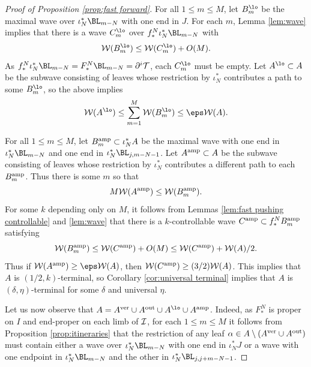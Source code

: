 \documentclass[12pt]{amsart}
\begin{document}
\begin{proof}[Proof of Proposition \ref{prop:fast forward}]
	
	
	
	For all $1\leq m \leq M$, let $B^\lo_m$ be the maximal wave over $\iota_N^*\BL_{m-N}$ with one end in $J$. For each $m$, Lemma \ref{lem:wave} implies that there is a wave $C^\lo_m$ over $f^N_*\iota_N^*\BL_{m-N}$ with 
	$$\WW(B^\lo_m)\leq \WW(C^\lo_m)+O(M).$$
	As $f^N_*\iota_N^*\BL_{m-N}= F_*^N\BL_{m-N} = \ddi\TT$, each $C^\lo_m$ must be empty. 
	Let $A^\lo\subset A$ be the subwave consisting of leaves whose restriction by $\iota_N^*$ contributes a path to some $B_m^\lo$, so the above implies 
	$$\WW(A^\lo)\leq \sum_{m=1}^M\WW(B_m^\lo)\leq \eps\WW(A).$$
	
	
	For all $1\leq m\leq M$, let $B_m^{\mathrm{amp}}\subset \iota_{N}^*A$
	be the maximal wave with one end in $\iota_N^*\BL_{m-N}$ and one end in $\iota_N^*\BL_{j, m-N-1}$. Let $A^{\mathrm{amp}}\subset A$ be the subwave consisting of leaves whose restriction by $\iota_{N}^*$ contributes a different path to each $B_m^{\mathrm{amp}}$. 
	Thus there is some $m$ so that 
	$$M\mathcal W(A^{\mathrm{amp}})\leq \mathcal W(B_m^{\mathrm{amp}}).$$
	For some $k$ depending only on $M$, it follows from Lemmas \ref{lem:fast pushing controllable} and \ref{lem:wave} that there is a $k$-controllable wave $C^{\mathrm{amp}}\subset f^{N}_*B_m^{\mathrm{amp}}$ satisfying 
	$$\mathcal W(B_m^{\mathrm{amp}})\leq \mathcal W(C^{\mathrm{amp}})+O(M)\leq \mathcal W(C^{\mathrm{amp}})+ \mathcal W(A)/2.$$
	Thus if $\WW(A^\amp)\geq \eps\WW(A)$, then $\mathcal W(C^{\mathrm{amp}})\geq (3/2)\mathcal W(A)$. This implies that $A$ is $(1/2, k)$-terminal, so Corollary \ref{cor:universal terminal} implies that $A$ is $(\delta, \eta)$-terminal for some $\delta$ and universal $\eta$.
	
	
	Let us now observe that $A= A^\ver\cup A^{\out}\cup A^\lo\cup A^\amp$. 
	Indeed, as $F_*^N$ is proper on $I$ and end-proper on each limb of $\mathcal I$,  for each $1\leq m \leq M$ it follows from Proposition \ref{prop:itineraries} that the restriction of any  leaf $\alpha\in A\setminus (A^{\mathrm{ver}}\cup A^{\operatorname{out}})$ must  contain either a wave over $\iota_N^*\BL_{m-N}$  with one end in $\iota_N^*J$ or a wave with one endpoint in $\iota_N^*\BL_{m-N}$ and the other in   $\iota_N^*\BL_{j, j+m-N-1}$.
	

\end{proof}
\end{document}
